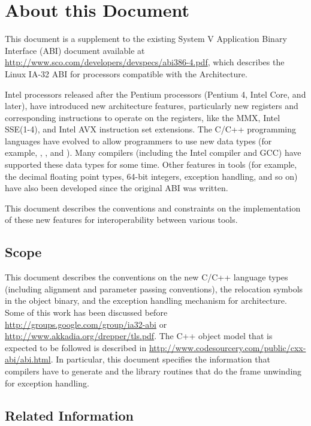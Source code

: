 \chapter{About this Document\label{intro}}

This document is a supplement to the existing \xARCH System V
Application Binary Interface (ABI) document available at
\url{http://www.sco.com/developers/devspecs/abi386-4.pdf},
which describes the Linux IA-32 ABI for processors compatible with the
\xARCH Architecture.

Intel processors released after the Pentium processors (Pentium 4,
Intel Core, and later), have introduced new architecture features,
particularly new registers and corresponding instructions to operate on
the registers, like the MMX, Intel SSE(1-4), and Intel AVX instruction
set extensions. The C/C++ programming languages have evolved to allow
programmers to use new data types (for example, ,
, and ). Many compilers (including the Intel
compiler and GCC) have supported these data types for some time. Other
features in tools (for example, the decimal floating point types, 64-bit
integers, exception handling, and so on) have also been developed since
the original ABI was written.

This document describes the conventions and constraints on the
implementation of these new features for interoperability between
various tools.

\section{Scope}

This document describes the conventions on the new C/C++ language types
(including alignment and parameter passing conventions), the relocation
symbols in the object binary, and the exception handling mechanism for
\xARCH architecture.  Some of this work has been discussed before
\url{http://groups.google.com/group/ia32-abi} or
\url{http://www.akkadia.org/drepper/tls.pdf}. The C++ object model that
is expected to be followed is described in
\url{http://www.codesourcery.com/public/cxx-abi/abi.html}.  In particular,
this document specifies the information that compilers have to generate
and the library routines that do the frame unwinding for exception
handling.

\section{Related Information}

